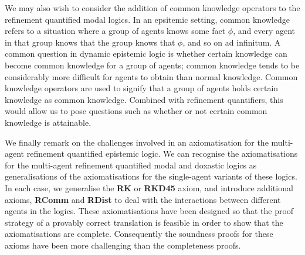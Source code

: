 We may also wish to consider the addition of common knowledge operators to the
refinement quantified modal logics. In an epsitemic setting, common knowledge
refers to a situation where a group of agents knows some fact $\phi$, and every
agent in that group knows that the group knows that $\phi$, and so on ad
infinitum. A common question in dynamic epistemic logic is whether certain
knowledge can become common knowledge for a group of agents; common knowledge
tends to be considerably more difficult for agents to obtain than normal
knowledge. Common knowledge operators are used to signify that a group of agents
holds certain knowledge as common knowledge. Combined with refinement
quantifiers, this would allow us to pose questions such as whether or not
certain common knowledge is attainable.

We finally remark on the challenges involved in an axiomatisation for the
multi-agent refinement quantified epistemic logic. We can recognise the
axiomatisations for the multi-agent refinement quantified modal and doxastic
logics as generalisations of the axiomatisations for the single-agent variants
of these logics. In each case, we generalise the {\bf RK} or {\bf RKD45} axiom,
and introduce additional axioms, {\bf RComm} and {\bf RDist} to deal with the
interactions between different agents in the logics. These axiomatisations have
been designed so that the proof strategy of a provably correct translation is
feasible in order to show that the axiomatisations are complete. Consequently
the soundness proofs for these axioms have been more challenging than the
completeness proofs.


